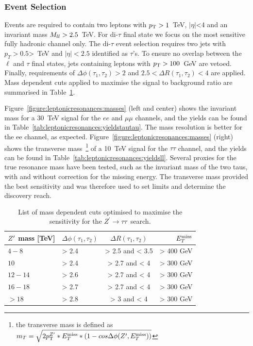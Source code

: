 \documentclass{cernrep}
\newcommand*{\Zptata}{\ensuremath{Z^{\prime}\rightarrow \tau\tau}}
\newcommand*{\met}{\ensuremath{E_{T}^{\rm{miss}}}}
\begin{document}
\subsubsection{Event Selection}
Events are required to contain two leptons with $p_{\text{T}} > 1$~TeV, $|\eta|$<4 and an invariant mass $M_{ll} > 2.5$~TeV. For di-$\tau$ final state we focus on the most sensitive fully hadronic channel only. The di-$\tau$ event selection requires two jets with $p_{T} > 0.5$>~TeV and $|\eta|<2.5$ identified as $\tau$'s. To ensure no overlap between the $\ell$ and $\tau$ final states, jets containing leptons with $p_{\text{T}} > 100$~GeV are vetoed. Finally, requirements of $\Delta \phi(\tau_1, \tau_2)> 2$ and $2.5<\Delta R(\tau_1, \tau_2)<4$ are applied.
Mass dependent cuts applied to maximise the signal to background ratio are summarised in Table~\ref{tab:leptonicresonances:selectiontautau}.

Figure~\ref{figure:leptonicresonances:masses} (left and center) shows the invariant mass for a 30~TeV signal for the $ee$ and $\mu\mu$ channels, and the yields can be found in Table~\ref{tab:leptonicresonances:yieldstautau}. The mass resolution is better for the ee channel, as expected. Figure~\ref{figure:leptonicresonances:masses} (right) shows the transverse mass~\footnote{the transverse mass is defined as $m_{T}  =  \sqrt{2\ptZp*\met*(1-cos\Delta\phi(\Zp,\met))} $}
of a 10~TeV signal for the $\tau\tau$ channel, and the yields can be found in Table~\ref{tab:leptonicresonances:yieldsll}.
Several proxies for the true resonance mass have been tested, such as the invariant mass of the two taus, with and without correction for the missing energy. The transverse mass provided the best sensitivity and was therefore used to set limits and determine the discovery reach.

\begin{table}[htbp]
   \centering
\begin{tabular}{l|l|c|r}
   $Z^{\prime}$ mass [TeV] &  $\Delta \phi(\tau_1, \tau_2)$&  $\Delta R(\tau_1, \tau_2)$ & $\met$\\
  \hline
  $4-8$ & > 2.4 & > 2.5 and < 3.5 & > 400 GeV\\
  $10$ & > 2.4 & > 2.7 and < 4 & > 300 GeV\\
  $12-14$ & > 2.6 & > 2.7 and < 4 & > 300 GeV\\
  $16-18$ & > 2.7 & > 2.7 and < 4 & > 300 GeV\\
  $>18$ & > 2.8 & > 3 and < 4 & > 300 GeV\\
  \end{tabular}
  \caption{List of mass dependent cuts optimised to maximise the sensitivity for the \Zptata\ search.}
  \label{tab:leptonicresonances:selectiontautau}
\end{table}
\end{document}
